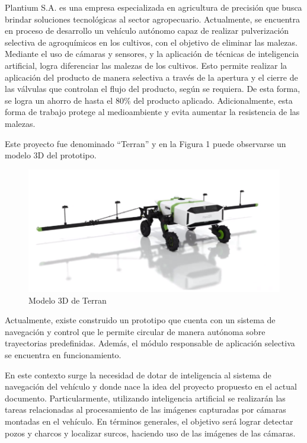 \documentclass[
11pt, %
codirector, %
]{charter}
\begin{document}
Plantium S.A. es una empresa especializada en agricultura de precisión que busca brindar soluciones tecnológicas al sector agropecuario. Actualmente, se encuentra en proceso de desarrollo un vehículo autónomo capaz de realizar pulverización selectiva de agroquímicos en los cultivos, con el objetivo de eliminar las malezas. Mediante el uso de cámaras y sensores, y la aplicación de técnicas de inteligencia artificial, logra diferenciar las malezas de los cultivos. Esto permite realizar la aplicación del producto de manera selectiva a través de la apertura y el cierre de las válvulas que controlan el flujo del producto, según se requiera. De esta forma, se logra un ahorro de hasta el 80\% del producto aplicado. Adicionalmente, esta forma de trabajo protege al medioambiente y evita aumentar la resistencia de las malezas.

Este proyecto fue denominado “Terran” y en la Figura 1 puede observarse un modelo 3D del prototipo.

\begin{figure}[htpb]
\centering 
\includegraphics[width=.8\textwidth]{./Figuras/terran_3d.png}
\caption{Modelo 3D de Terran}
\label{fig:terran_3d}
\end{figure}

Actualmente, existe construido un prototipo que cuenta con un sistema de navegación y control que le permite circular de manera autónoma sobre trayectorias predefinidas. Además, el módulo responsable de aplicación selectiva se encuentra en funcionamiento. 

En este contexto surge la necesidad de dotar de inteligencia al sistema de navegación del vehículo y donde nace la idea del proyecto propuesto en el actual documento. Particularmente, utilizando inteligencia artificial se realizarán las tareas relacionadas al procesamiento de las imágenes capturadas por cámaras montadas en el vehículo. En términos generales, el objetivo será lograr detectar pozos y charcos y localizar surcos, haciendo uso de las imágenes de las cámaras.
\end{document}
